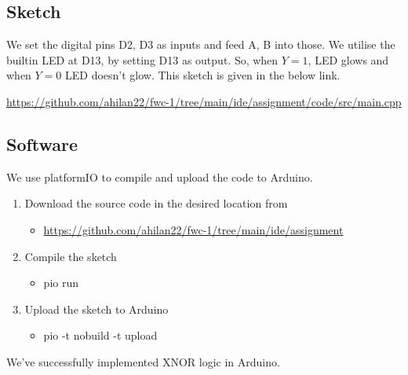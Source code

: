\documentclass[journal,12pt,twocolumn]{IEEEtran}
\begin{document}
\subsection{Sketch}
We set the digital pins D2, D3 as inputs and feed A, B into those. We utilise the builtin LED at D13, by setting D13 as output. So, when $Y=1$, LED glows and when $Y=0$ LED doesn't glow. This sketch is given in the below link.

\bigskip

\url{https://github.com/ahilan22/fwc-1/tree/main/ide/assignment/code/src/main.cpp}

\subsection{Software}
We use platformIO to compile and upload the code to Arduino. 
\bigskip
\begin{enumerate}
	\item Download the source code in the desired location from
		\begin{itemize}
			\item \url{https://github.com/ahilan22/fwc-1/tree/main/ide/assignment}
		\end{itemize}
	\item Compile the sketch
		\begin{itemize}
			\item pio run
		\end{itemize}
	\item Upload the sketch to Arduino
		\begin{itemize}
			\item pio -t nobuild -t upload
		\end{itemize}
\end{enumerate}
\bigskip
We've successfully implemented XNOR logic in Arduino.
\end{document}
